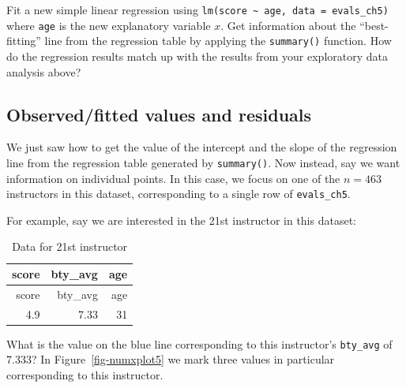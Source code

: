 \documentclass[
  letterpaper,
  DIV=11,
  numbers=noendperiod]{scrreprt}
\theoremstyle{definition}
\theoremstyle{remark}
\begin{document}
\begin{tcolorbox}[enhanced jigsaw, coltitle=black, toprule=.15mm, bottomtitle=1mm, breakable, leftrule=.75mm, title={{🎯} Learning Check 5.2}, opacitybacktitle=0.6, colback=white, rightrule=.15mm, opacityback=0, toptitle=1mm, colbacktitle=quarto-callout-tip-color!10!white, colframe=quarto-callout-tip-color-frame, titlerule=0mm, arc=.35mm, bottomrule=.15mm, left=2mm]
Fit a new simple linear regression using
\texttt{lm(score\ \textasciitilde{}\ age,\ data\ =\ evals\_ch5)} where
\texttt{age} is the new explanatory variable \(x\). Get information
about the ``best-fitting'' line from the regression table by applying
the \texttt{summary()} function. How do the regression results match up
with the results from your exploratory data analysis above?
\end{tcolorbox}

\hypertarget{sec-model1points}{%
\subsection{Observed/fitted values and
residuals}\label{sec-model1points}}

We just saw how to get the value of the intercept and the slope of the
regression line from the regression table generated by
\texttt{summary()}. Now instead, say we want information on individual
points. In this case, we focus on one of the \(n = 463\) instructors in
this dataset, corresponding to a single row of \texttt{evals\_ch5}.

For example, say we are interested in the 21st instructor in this
dataset:

\begin{longtable}[]{@{}rrr@{}}
\caption{Data for 21st instructor}\tabularnewline
\toprule()
score & bty\_avg & age \\
\midrule()
\endfirsthead
\toprule()
score & bty\_avg & age \\
\midrule()
\endhead
4.9 & 7.33 & 31 \\
\bottomrule()
\end{longtable}

What is the value on the blue line corresponding to this instructor's
\texttt{bty\_avg} of 7.333? In Figure~\ref{fig-numxplot5} we mark three
values in particular corresponding to this instructor.
\end{document}
